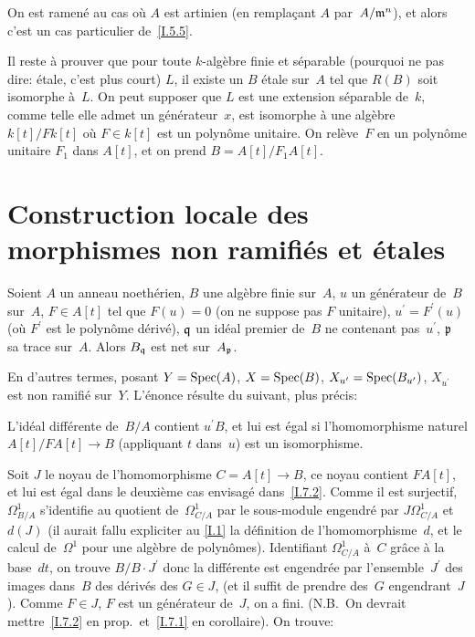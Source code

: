 On est ramen\'e au cas o\`u $A$ est artinien (en rempla\c cant
$A$ par~$A/\mathfrak{m}^n$), et alors c'est un cas particulier
de~\ref{I.5.5}.

Il reste \`a prouver que pour toute $k$-alg\`ebre finie et
s\'eparable (pourquoi ne pas dire: \'etale, c'est plus court) $L$,
il existe un $B$ \'etale sur~$A$ tel que $R(B)$ soit isomorphe
\`a~$L$. On peut supposer que $L$ est une extension s\'eparable
de~$k$, comme telle elle admet un g\'en\'erateur~$x$, \ie est
isomorphe \`a une alg\`ebre $k[t]/Fk[t]$ o\`u $F \in k[t]$ est
un polyn\^ome unitaire. On rel\`eve~$F$ en un polyn\^ome
unitaire $F_1$ dans $A[t]$, et on prend $B = A[t]/F_1A[t]$.

\section{Construction locale des morphismes non ramifi\'es et \'etales}
\label{I.7}

\begin{proposition}
\label{I.7.1}
Soient $A$ un anneau noeth\'erien, $B$ une alg\`ebre finie
sur~$A$, $u$ un g\'en\'erateur de~$B$ sur~$A$, $F \in A[t]$ tel
que $F(u) = 0$ (on ne suppose pas $F$ unitaire), $u^\prime =
F^\prime(u)$ (o\`u $F^\prime$ est le polyn\^ome d\'eriv\'e),
$\mathfrak{q}$ un id\'eal premier de~$B$ ne contenant pas~$u^\prime$,
$\mathfrak{p}$ sa trace sur~$A$. Alors $B_\mathfrak{q}$ est net sur~$A_\mathfrak{p}$.
\end{proposition}

En d'autres termes, posant $Y = \operatorname{Spec}(A)$, $X= \operatorname{Spec}(B)$,
$X_{u^\prime} = \operatorname{Spec}(B_{u^\prime})$, $X_{u^\prime}$ est non
ramifi\'e sur~$Y$. L'\'enonce r\'esulte du suivant, plus
pr\'ecis:

\begin{corollaire}
\label{I.7.2}
L'id\'eal diff\'erente de~$B/A$ contient $u^\prime B$, et lui est
\'egal si l'homo\-morphisme naturel $A[t]/FA[t] \to B$ (appliquant
$t$ dans~$u$) est un isomorphisme.
\end{corollaire}

Soit $J$ le noyau de l'homomorphisme $C = A[t] \to B$, ce noyau
contient $FA[t]$, et lui est \'egal dans le deuxi\`eme cas
envisag\'e dans~\ref{I.7.2}. Comme il est surjectif,
$\Omega^1_{B/A}$ s'identifie au quotient de~$\Omega^1_{C/A}$ par le
sous-module engendr\'e par $J\Omega^1_{C/A}$ et $d(J)$ (il aurait
fallu expliciter au \No\ref{I.1} la d\'efinition de l'homomorphisme~$d$, et
le calcul de~$\Omega^1$ pour une alg\`ebre de polyn\^omes).
Identifiant $\Omega^1_{C/A}$ \`a~$C$ gr\^ace \`a la base~$dt$,
on trouve $B/B\cdot J^\prime$ donc la diff\'erente est engendr\'ee
par l'ensemble~$J^\prime$ des images dans~$B$ des d\'eriv\'es des
$G \in J$, (et il suffit de prendre des~$G$ engendrant~$J$). Comme
$F\in J$, \resp $F$ est un g\'en\'erateur de~$J$, on a
fini. (N.B.\ On devrait mettre~\ref{I.7.2} en prop.\
et~\ref{I.7.1} en corollaire). On trouve:

